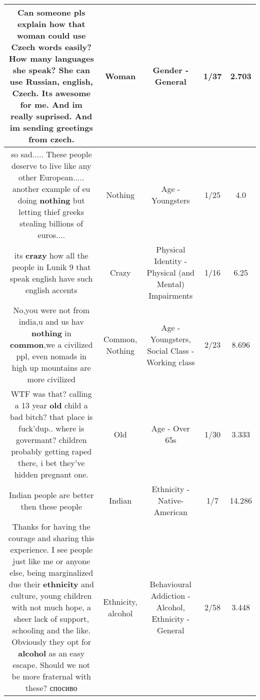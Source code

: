 \documentclass[11pt]{article}
\newlength\mylength
\begin{document}
\begin{center}
\begin{longtable}{|C{.65\mylength}|C{.30\mylength}|C{.12\mylength}|C{.12\mylength}|C{.12\mylength}|}
  \small Can someone pls explain how that \textbf{woman} could use Czech words easily? How many languages she speak? She can use Russian, english, Czech. Its awesome for me. And im really suprised. And im sending greetings from czech.\normalsize   & Woman & Gender - General & 1/37 & 2.703 \\  \hline
  \small so sad..... These people deserve to live like any other European.....  another example of eu doing \textbf{nothing} but letting  thief  greeks stealing billions of euros....\normalsize   & Nothing & Age - Youngsters & 1/25 & 4.0 \\  \hline
  \small its \textbf{crazy} how all the people in Lunik 9 that speak english have such english accents\normalsize   & Crazy & Physical Identity - Physical (and Mental) Impairments & 1/16 & 6.25 \\  \hline
  \small No,you were not from india,u and us hav \textbf{nothing} in \textbf{common},we a civilized ppl, even nomads in high up mountains are more  civilized\normalsize   & Common, Nothing & Age - Youngsters, Social Class - Working class & 2/23 & 8.696 \\  \hline
  \small WTF was that? calling a 13 year \textbf{old} child a bad bitch?  that place is fuck'dup.. where is govermant? children probably getting raped there, i bet they've hidden pregnant one.\normalsize   & Old & Age - Over 65s & 1/30 & 3.333 \\  \hline
  \small Indian people are better then these people\normalsize   & Indian & Ethnicity - Native-American & 1/7 & 14.286 \\  \hline
  \small Thanks for having the courage and sharing this experience. I see people just like me or anyone else, being marginalized due their \textbf{ethnicity} and culture, young children with not much hope, a sheer lack of support, schooling and the like. Obviously they opt for \textbf{alcohol} as an easy escape. Should we not be more fraternal with these? спосиво\normalsize   & Ethnicity, alcohol & Behavioural Addiction - Alcohol, Ethnicity - General & 2/58 & 3.448 \\  \hline

\end{longtable}
\end{center}
\end{document}
